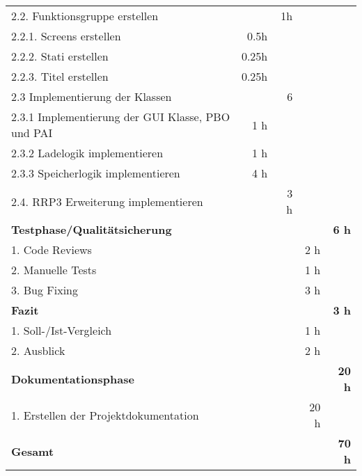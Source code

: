 \begin{tabularx}{\textwidth}{Xrrrr}
\rowcolor{odd}2.2. Funktionsgruppe erstellen & & 1h & & \\
2.2.1. Screens erstellen & 0.5h & & & \\
\rowcolor{odd}2.2.2. Stati erstellen & 0.25h & & & \\
2.2.3. Titel erstellen & 0.25h & & & \\
\rowcolor{odd}2.3 Implementierung der Klassen & & 6 & & \\
2.3.1 Implementierung der GUI Klasse, PBO und PAI & 1 h & & & \\
\rowcolor{odd}2.3.2 Ladelogik implementieren & 1 h & & & \\
2.3.3 Speicherlogik implementieren & 4 h & & & \\
\rowcolor{odd}2.4. RRP3 Erweiterung implementieren & & 3 h & & \\
\rowcolor{heading}\textbf{Testphase/Qualitätsicherung} & \textbf{} & \textbf{} & \textbf{} & \textbf{6 h} \\
1. Code Reviews & & & 2 h   &  \\
\rowcolor{odd} 2. Manuelle Tests & & & 1 h & \\
3. Bug Fixing & & & 3 h & \\
\rowcolor{heading}\textbf{Fazit} & \textbf{} & \textbf{} & \textbf{} & \textbf{3 h} \\
1. Soll-/Ist-Vergleich & & & 1 h   &  \\
\rowcolor{odd}2. Ausblick & & & 2 h & \\
\rowcolor{heading}\textbf{Dokumentationsphase} & \textbf{} & \textbf{} & \textbf{} & \textbf{20 h} \\1. Erstellen der Projektdokumentation & & & 20 h & \\
\hline
\hline
\rowcolor{heading}\textbf{Gesamt} & \textbf{} & \textbf{} & \textbf{} & \textbf{70 h} \\
\end{tabularx}
